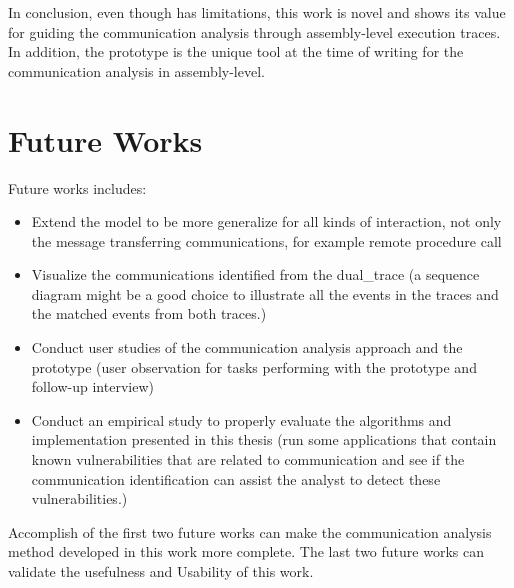\documentclass[12pt,oneside]{book}
\begin{document}
In conclusion, even though has limitations, this work is novel and shows its value for guiding the communication analysis through assembly-level execution traces. In addition, the prototype is the unique tool at the time of writing for the communication analysis in assembly-level.

\section{Future Works}

Future works includes:
\begin{itemize}
\item Extend the model to be more generalize for all kinds of interaction, not only the message transferring communications, for example remote procedure call
\item Visualize the communications identified from the dual\_trace (a sequence diagram might be a good choice to illustrate all the events in the traces and the matched events from both traces.) 
\item Conduct user studies of the communication analysis approach and the prototype (user observation for tasks performing with the prototype and follow-up interview)
\item Conduct an empirical study to properly evaluate the algorithms and implementation presented in this thesis (run some applications that contain known vulnerabilities that are related to communication and see if the communication identification can assist the analyst to detect these vulnerabilities.)
\end{itemize}

Accomplish of the first two future works can make the communication analysis method developed in this work more complete. The last two future works can validate the usefulness and Usability of this work.
\end{document}
